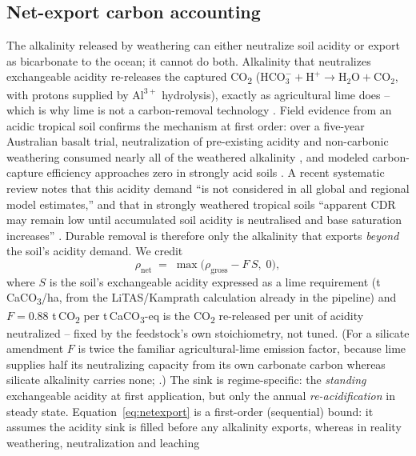 \documentclass[12pt]{article}
\newcommand{\co}{CO\textsubscript{2}}
\begin{document}
\subsection{Net-export carbon accounting}\label{sec:netexport}
The alkalinity released by weathering can either neutralize soil acidity or
export as bicarbonate to the ocean; it cannot do both. Alkalinity that
neutralizes exchangeable acidity re-releases the captured \co{}
($\mathrm{HCO_3^- + H^+ \to H_2O + CO_2}$, with protons supplied by
$\mathrm{Al^{3+}}$ hydrolysis), exactly as agricultural lime does -- which is why
lime is not a carbon-removal technology \citep{west2005,hamilton2007}. Field
evidence from an acidic tropical soil confirms the mechanism at first order: over
a five-year Australian basalt trial, neutralization of pre-existing acidity and
non-carbonic weathering consumed nearly all of the weathered alkalinity
\citep{holden2024}, and modeled carbon-capture efficiency approaches zero in
strongly acid soils \citep{bertagni2022}. A recent systematic review notes that
this acidity demand ``is not considered in all global and regional model
estimates,'' and that in strongly weathered tropical soils ``apparent CDR may
remain low until accumulated soil acidity is neutralised and base saturation
increases'' \citep[\S3.4.3, \S5.2.4]{suhrhoff2026esroc}. Durable removal is therefore only the
alkalinity that exports \emph{beyond} the soil's acidity demand. We credit
\begin{equation}
  \rho_{\text{net}} \;=\; \max\!\big(\rho_{\text{gross}} - F\,S,\; 0\big),
  \label{eq:netexport}
\end{equation}
where $S$ is the soil's exchangeable acidity expressed as a lime requirement
(t\,CaCO\textsubscript{3}/ha, from the LiTAS/Kamprath calculation already in the
pipeline) and $F = 0.88$ t\,CO\textsubscript{2} per t\,CaCO\textsubscript{3}-eq
is the \co{} re-released per unit of acidity neutralized -- fixed by the
feedstock's own stoichiometry, not tuned. (For a silicate amendment $F$ is twice
the familiar agricultural-lime emission factor, because lime supplies half its
neutralizing capacity from its own carbonate carbon whereas silicate alkalinity
carries none; \citealp{west2005,hamilton2007}.) The sink is regime-specific: the
\emph{standing} exchangeable acidity at first application, but only the annual
\emph{re-acidification} in steady state. Equation~\eqref{eq:netexport} is a
first-order (sequential) bound: it assumes the acidity sink is filled before any
alkalinity exports, whereas in reality weathering, neutralization and leaching
\end{document}
